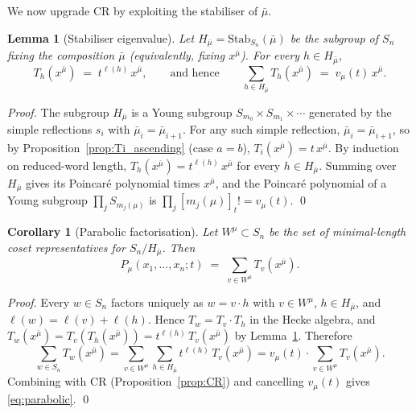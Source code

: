\documentclass[11pt]{article}
\newtheorem{lemma}[theorem]{Lemma}
\newtheorem{corollary}[theorem]{Corollary}
\theoremstyle{definition}
\begin{document}
We now upgrade CR by exploiting the stabiliser of $\bar\mu$.

\begin{lemma}[Stabiliser eigenvalue]\label{lem:stab_eig}
Let $H_{\bar\mu} = \mathrm{Stab}_{S_n}(\bar\mu)$ be the subgroup of $S_n$
fixing the composition $\bar\mu$ (equivalently, fixing $x^{\bar\mu}$).
For every $h \in H_{\bar\mu}$,
\[
T_h(x^{\bar\mu}) \;=\; t^{\ell(h)}\, x^{\bar\mu},
\qquad\text{and hence}\qquad
\sum_{h \in H_{\bar\mu}} T_h(x^{\bar\mu}) \;=\; v_\mu(t)\, x^{\bar\mu}.
\]
\end{lemma}

\begin{proof}
The subgroup $H_{\bar\mu}$ is a Young subgroup
$S_{m_0} \times S_{m_1} \times \cdots$ generated by the simple reflections
$s_i$ with $\bar\mu_i = \bar\mu_{i+1}$. For any such simple reflection,
$\bar\mu_i = \bar\mu_{i+1}$, so by Proposition~\ref{prop:Ti_ascending}
(case $a = b$), $T_i(x^{\bar\mu}) = t\,x^{\bar\mu}$. By induction on
reduced-word length, $T_h(x^{\bar\mu}) = t^{\ell(h)}\,x^{\bar\mu}$ for
every $h \in H_{\bar\mu}$. Summing over $H_{\bar\mu}$ gives its Poincar\'e
polynomial times $x^{\bar\mu}$, and the Poincar\'e polynomial of a Young
subgroup $\prod_j S_{m_j(\mu)}$ is $\prod_j [m_j(\mu)]_t! = v_\mu(t)$.
\qed
\end{proof}

\begin{corollary}[Parabolic factorisation]\label{cor:parabolic}
Let $W^\mu \subset S_n$ be the set of \emph{minimal-length coset
representatives} for $S_n / H_{\bar\mu}$. Then
\begin{equation}\label{eq:parabolic}
P_\mu(x_1, \ldots, x_n; t) \;=\; \sum_{v \in W^\mu} T_v(x^{\bar\mu}).
\end{equation}
\end{corollary}

\begin{proof}
Every $w \in S_n$ factors uniquely as $w = v \cdot h$ with $v \in W^\mu$,
$h \in H_{\bar\mu}$, and $\ell(w) = \ell(v) + \ell(h)$. Hence
$T_w = T_v \cdot T_h$ in the Hecke algebra, and
$T_w(x^{\bar\mu}) = T_v(T_h(x^{\bar\mu})) = t^{\ell(h)}\, T_v(x^{\bar\mu})$
by Lemma~\ref{lem:stab_eig}. Therefore
\[
\sum_{w \in S_n} T_w(x^{\bar\mu})
= \sum_{v \in W^\mu} \sum_{h \in H_{\bar\mu}} t^{\ell(h)}\, T_v(x^{\bar\mu})
= v_\mu(t)\cdot \sum_{v \in W^\mu} T_v(x^{\bar\mu}).
\]
Combining with CR (Proposition~\ref{prop:CR}) and cancelling $v_\mu(t)$
gives \eqref{eq:parabolic}. \qed
\end{proof}
\end{document}
